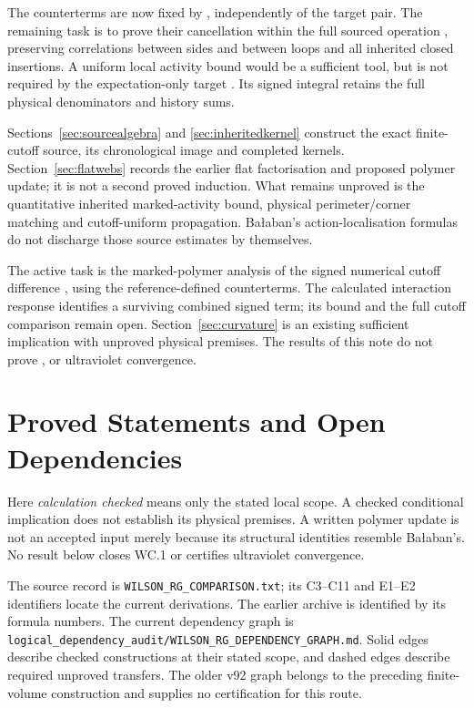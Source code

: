 \documentclass[11pt]{preprint}
\numberwithin{equation}{section}
\begin{document}
The counterterms are now fixed by , independently of the target pair. The remaining task is to prove their cancellation within the full sourced operation , preserving correlations between sides and between loops and all inherited closed insertions. A uniform local activity bound would be a sufficient tool, but is not required by the expectation-only target . Its signed integral retains the full physical denominators and history sums.

Sections~\ref{sec:sourcealgebra} and \ref{sec:inheritedkernel} construct the exact finite-cutoff source, its chronological image and completed kernels. Section~\ref{sec:flatwebs} records the earlier flat factorisation and proposed polymer update; it is not a second proved induction. What remains unproved is the quantitative inherited marked-activity bound, physical perimeter/corner matching and cutoff-uniform propagation. Ba{\l}aban's action-localisation formulas \cite[eqs.~(1.49)--(1.50), (1.65)]{LFR2} do not discharge those source estimates by themselves.

The active task is the marked-polymer analysis of the signed numerical cutoff difference , using the reference-defined counterterms. The calculated interaction response  identifies a surviving combined signed term; its bound and the full cutoff comparison remain open. Section~\ref{sec:curvature} is an existing sufficient implication with unproved physical premises. The results of this note do not prove ,  or ultraviolet convergence.

\appendix
\section{Proved Statements and Open Dependencies}
\label{sec:ledger}

Here \emph{calculation checked} means only the stated local scope. A checked conditional implication does not establish its physical premises. A written polymer update is not an accepted input merely because its structural identities resemble Ba{\l}aban's. No result below closes WC.1 or certifies ultraviolet convergence.

The source record is \texttt{WILSON\_RG\_COMPARISON.txt}; its C3--C11 and E1--E2 identifiers locate the current derivations. The earlier archive is identified by its formula numbers. The current dependency graph is \nolinkurl{logical_dependency_audit/WILSON_RG_DEPENDENCY_GRAPH.md}. Solid edges describe checked constructions at their stated scope, and dashed edges describe required unproved transfers. The older v92 graph belongs to the preceding finite-volume construction and supplies no certification for this route.
\end{document}
